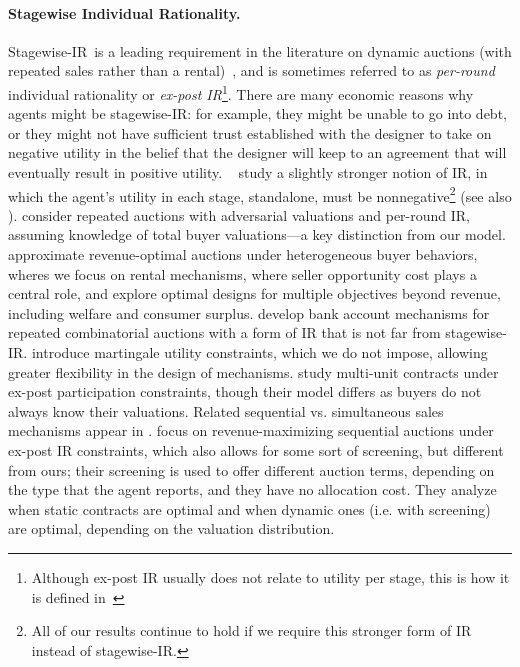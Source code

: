\documentclass[11pt,letterpaper]{article}
\newcommand{\swir}{stagewise-IR\xspace}
\newcommand{\Swir}{Stagewise-IR\xspace}
\theoremstyle{plain}
\begin{document}
\paragraph{Stagewise Individual Rationality.} \Swir\ is a leading requirement in the literature on dynamic auctions (with repeated sales rather than a rental)~\cite{MirrokniLTZ16,MirrokniLTZ18,BravermanSW21}, and is sometimes referred to as \emph{per-round} individual rationality or \emph{ex-post IR}\footnote{Although ex-post IR usually does not relate to utility per stage, this is how it is defined in~\cite{MirrokniLTZ19}}.
 There are many economic reasons why agents might be \swir: for example, they might be unable to go into debt, or they might not have sufficient trust established with the designer to take on negative utility in the belief that the designer will keep to an agreement that will eventually result in positive utility.
~\cite{0001DMS18,AshlagiDH16,BalseiroML17}  study a slightly stronger notion of IR, in which the agent's utility in each stage, standalone, must be nonnegative\footnote{All of our results continue to hold if we require this stronger form of IR instead of \swir.} 
(see also \cite{PapadimitriouPP16,collina2024repeated}).
\cite{BravermanSW21} consider repeated auctions with adversarial valuations and per-round IR, assuming knowledge of total buyer valuations—a key distinction from our model.
\cite{0001DMS18} approximate revenue-optimal auctions under heterogeneous buyer behaviors, wheres we focus on rental mechanisms, where seller opportunity cost plays a central role, and explore optimal designs for multiple objectives beyond revenue, including welfare and consumer surplus.
 \cite{MirrokniLTZ16} develop bank account mechanisms for repeated combinatorial auctions with a form of IR that is not far from \swir. 
\cite{BalseiroML17} introduce martingale utility constraints, which we do not impose, allowing greater flexibility in the design of mechanisms.  \cite{krahmer2016optimality} study multi-unit contracts under ex-post participation constraints, though their model differs as buyers do not always know their valuations. 
Related sequential vs. simultaneous sales mechanisms appear in \cite{hausch1986multi,PapadimitriouPP16,AshlagiDH16}. 
\cite{BergemannCW17} focus on revenue-maximizing sequential auctions under ex-post IR constraints, which also allows for some sort of screening, but different from ours; their screening is used to offer different auction terms, depending on the type that the agent reports, and they have no allocation cost. They analyze when static contracts are optimal and when dynamic ones (i.e. with screening) are optimal, depending on the valuation distribution. 
\end{document}
